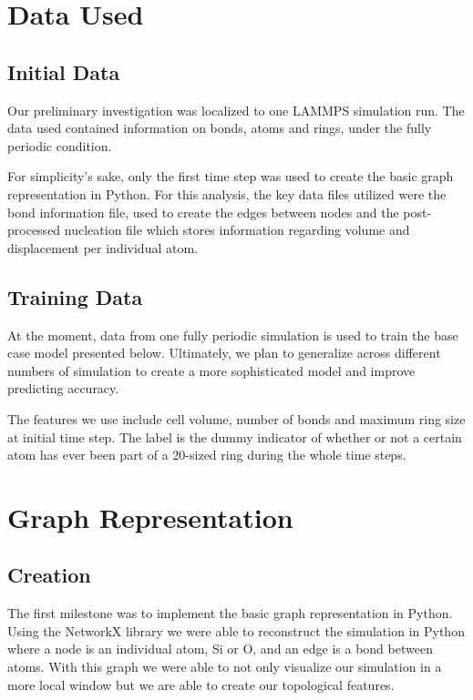 \section{Data Used}
\subsection{Initial Data}

Our preliminary investigation was localized to one LAMMPS simulation run. The data used contained information on bonds, atoms and rings, under the fully periodic condition. 

For simplicity's sake, only the first time step was used to create the basic graph representation in Python. For this analysis, the key data files utilized were the bond information file, used to create the edges between nodes and the post-processed nucleation file which stores information regarding volume and displacement per individual atom.  

\subsection{Training Data}
At the moment, data from one fully periodic simulation is used to train the base case model presented below.  Ultimately, we plan to generalize across different numbers of simulation to create a more sophisticated model and improve predicting accuracy. 

The features we use include cell volume, number of bonds and maximum ring size at initial time step. The label is the dummy indicator of whether or not a certain atom has ever been part of a 20-sized ring during the whole time steps.

\section{Graph Representation}

\subsection{Creation}The first milestone was to implement the basic graph representation in Python. Using the NetworkX library we were able to reconstruct the simulation in Python where a node is an individual atom, Si or O, and an edge is a bond between atoms. With this graph we were able to not only visualize our simulation in a more local window but we are able to create our topological features.

